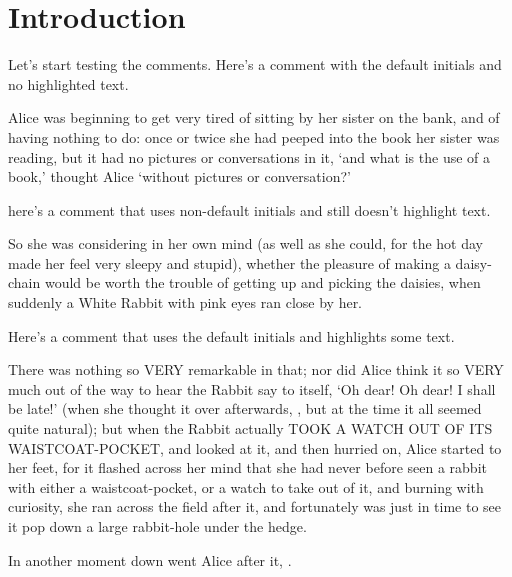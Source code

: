 \documentclass[draft]{article}
\begin{document}
\section{Introduction} %
\label{sec:introduction}
Let's start testing the comments.  Here's a comment with the default initials and no highlighted text.

Alice was beginning to get very tired of sitting by her sister on the bank, and of having nothing to do: once or twice she had peeped into the book her sister was reading, but it had no pictures or conversations in it, `and what is the use of a book,' thought Alice `without pictures or conversation?'

here's a comment that uses non-default initials and still doesn't highlight text.

So she was considering in her own mind (as well as she could, for the hot day made her feel very sleepy and stupid), whether the pleasure of making a daisy-chain would be worth the trouble of getting up and picking the daisies, when suddenly a White Rabbit with pink eyes ran close by her.

Here's a comment that uses the default initials and highlights some text.

There was nothing so VERY remarkable in that; nor did Alice think it so VERY much out of the way to hear the Rabbit say to itself, `Oh dear! Oh dear! I shall be late!' (when she thought it over afterwards, , but at the time it all seemed quite natural); but when the Rabbit actually TOOK A WATCH OUT OF ITS WAISTCOAT-POCKET, and looked at it, and then hurried on, Alice started to her feet, for it flashed across her mind that she had never before seen a rabbit with either a waistcoat-pocket, or a watch to take out of it, and burning with curiosity, she ran across the field after it, and fortunately was just in time to see it pop down a large rabbit-hole under the hedge.

In another moment down went Alice after it, .
\end{document}

